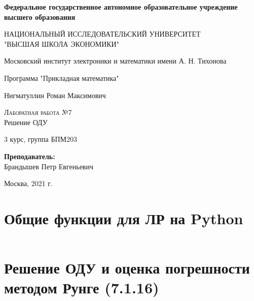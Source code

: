 \documentclass[a4paper,12pt]{article}
\newenvironment{longlisting}{\captionsetup{type=listing}}{}
\begin{document}
\begin{titlepage}
  \begin{center}
    \large
     
    \textbf{Федеральное государственное автономное образовательное учреждение высшего образования}
    \vspace{0.5cm}
 
    НАЦИОНАЛЬНЫЙ ИССЛЕДОВАТЕЛЬСКИЙ УНИВЕРСИТЕТ \\ "ВЫСШАЯ ШКОЛА ЭКОНОМИКИ"
    \vspace{0.5cm}
     
    Московский институт электроники и математики имени А. Н. Тихонова 
     
    Программа "Прикладная математика"
    \vfill
     
     
    Нигматуллин Роман Максимович
    \vfill
 
    \textsc{Лаборатная работа №7}\\[5mm]
     
    {\LARGE Решение ОДУ\\[2mm]
    }
  \bigskip
     
    3 курс, группа БПМ203
\end{center}
\vfill
 

 
\hfill\begin{flushright}
  \textbf{Преподаватель:}\\
  Брандышев Петр Евгеньевич
\end{flushright}%
\vfill
 
\begin{center}
  Москва, 2021 г.
\end{center}
\end{titlepage}


\tableofcontents

\section{Общие функции для ЛР на Python}
\begin{longlisting}
\inputminted{python}{src/ode.py}
\end{longlisting}

\section{Решение ОДУ и оценка погрешности методом Рунге (7.1.16)}
\end{document}
